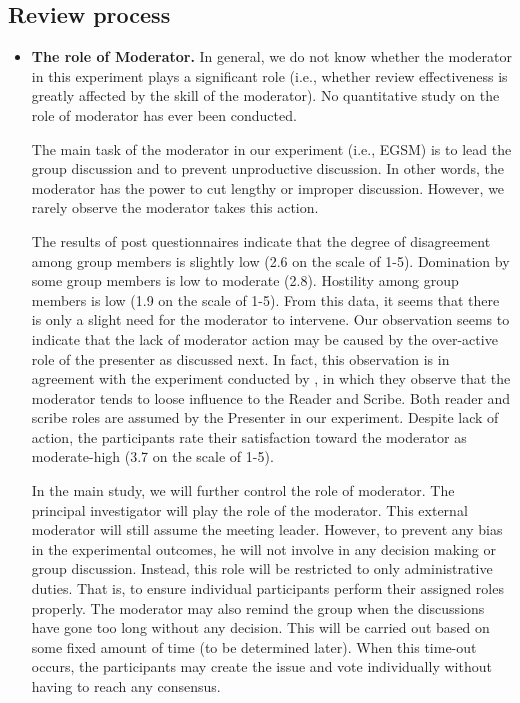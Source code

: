 \subsection{Review process}
\begin{itemize}
\item {\bf The role of Moderator.}
In general, we do not know whether the moderator in this experiment
plays a significant role (i.e., whether review effectiveness is greatly 
affected by the skill of the moderator). No quantitative study on the
role of moderator has ever been conducted.

The main task of the moderator in our experiment (i.e., EGSM) is to
lead the group discussion and to prevent unproductive
discussion. In other words, the moderator has the
power to cut lengthy or improper discussion. However, we rarely
observe the moderator takes this action.


The results of post questionnaires indicate that the degree of
disagreement among 
group members is slightly low (2.6 on the scale of 1-5). Domination by
some group members is low to moderate (2.8). Hostility among group
members is low (1.9 on the scale of 1-5). From this data, it seems
that there is only a slight need for the moderator to intervene.  
Our observation seems to indicate that the lack of moderator action
may be caused by the over-active role of the presenter as discussed
next. In fact, this observation is in agreement with the experiment
conducted by \cite{Brothers90}, in which they observe that the
moderator tends to loose 
influence to the Reader and Scribe. Both reader and scribe roles are
assumed by the Presenter in our experiment.
Despite lack of action, the participants rate their satisfaction
toward the moderator as moderate-high (3.7 on the scale of 1-5). 

In the main study, we will further control the role of moderator.
The principal investigator will play the role of the moderator.
This external moderator will still assume the meeting leader.
However, to prevent any bias in the experimental outcomes, he will not
involve in any decision making or group discussion.
Instead, this role will be restricted to only
administrative duties. That is, to ensure individual participants
perform their assigned roles properly. The moderator may also remind
the group when the discussions have gone too long without any
decision. This will be carried out based on some fixed amount of time
(to be determined later). When this time-out occurs, the
participants may create the issue and vote individually without having
to reach any consensus.



\end{itemize}

